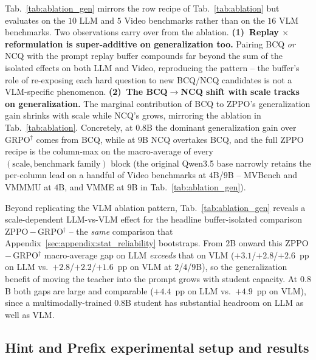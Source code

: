 \documentclass{llmxive}
\begin{document}
Tab.~\ref{tab:ablation_gen} mirrors the row recipe of Tab.~\ref{tab:ablation} but evaluates on the $10$ LLM and $5$ Video benchmarks rather than on the $16$ VLM benchmarks. Two observations carry over from the ablation. \textbf{(1)~Replay $\times$ reformulation is super-additive on generalization too.} Pairing BCQ \emph{or} NCQ with the prompt replay buffer compounds far beyond the sum of the isolated effects on both LLM and Video, reproducing the pattern -- the buffer's role of re-exposing each hard question to new BCQ/NCQ candidates is not a VLM-specific phenomenon. \textbf{(2)~The BCQ$\rightarrow$NCQ shift with scale tracks on generalization.} The marginal contribution of BCQ to ZPPO's generalization gain shrinks with scale while NCQ's grows, mirroring the ablation in Tab.~\ref{tab:ablation}. Concretely, at $0.8$B the dominant generalization gain over GRPO$^{\dagger}$ comes from BCQ, while at $9$B NCQ overtakes BCQ, and the full ZPPO recipe is the column-max on the macro-average of every $(\text{scale}, \text{benchmark family})$ block (the original Qwen3.5 base narrowly retains the per-column lead on a handful of Video benchmarks at $4$B/$9$B -- MVBench and VMMMU at $4$B, and VMME at $9$B in Tab.~\ref{tab:ablation_gen}).

Beyond replicating the VLM ablation pattern, Tab.~\ref{tab:ablation_gen} reveals a scale-dependent LLM-vs-VLM effect for the headline buffer-isolated comparison ZPPO\,$-$\,GRPO$^{\dagger}$ -- the \emph{same} comparison that Appendix~\ref{sec:appendix:stat_reliability} bootstraps. From $2$B onward this ZPPO\,$-$\,GRPO$^{\dagger}$ macro-average gap on LLM \emph{exceeds} that on VLM ($+3.1$/$+2.8$/$+2.6$~pp on LLM vs.\ $+2.8$/$+2.2$/$+1.6$~pp on VLM at $2$/$4$/$9$B), so the generalization benefit of moving the teacher into the prompt grows with student capacity. At $0.8$B both gaps are large and comparable ($+4.4$~pp on LLM vs.\ $+4.9$~pp on VLM), since a multimodally-trained $0.8$B student has substantial headroom on LLM as well as VLM.

\subsection{Hint and Prefix experimental setup and results}
\label{sec:appendix:hintprefix}
\end{document}
